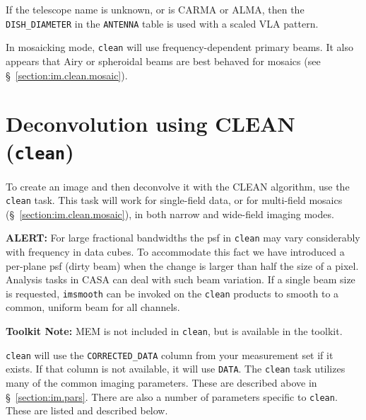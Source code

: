If the telescope name is unknown, or is CARMA or ALMA, then the
{\tt DISH\_DIAMETER} in the {\tt ANTENNA} table is used with a
scaled VLA pattern.


In mosaicking mode, {\tt clean} will use frequency-dependent primary beams. 
It also appears that Airy or spheroidal beams are best behaved for mosaics
(see \S~\ref{section:im.clean.mosaic}). 

\section{Deconvolution using CLEAN ({\tt clean})}
\label{section:im.clean}

To create an image and then deconvolve it with the CLEAN algorithm,
use the {\tt clean} task.  This task will work for single-field data,
or for multi-field mosaics (\S~\ref{section:im.clean.mosaic}), in both
narrow and wide-field imaging modes.  


\normalsize {\bf ALERT:} For large fractional bandwidths the psf in
{\tt clean} may vary considerably with frequency in data cubes. To
accommodate this fact we have introduced a per-plane psf (dirty beam)
when the change is larger than half the size of a pixel. Analysis
tasks in CASA can deal with such beam variation. If a single beam size
is requested, {\tt imsmooth} can be invoked on the {\tt clean}
products to smooth to a common, uniform beam for all channels. 


{\bf Toolkit Note:} MEM is not included in {\tt clean}, but is
available in the toolkit.

{\tt clean} will use the {\tt CORRECTED\_DATA} column from your
measurement set if it exists. If that column is not available, it will
use {\tt DATA}. The {\tt clean} task utilizes many of the common imaging
parameters.  These are described above in \S~\ref{section:im.pars}.
There are also a number of parameters specific to {\tt clean}.  These
are listed and described below.


